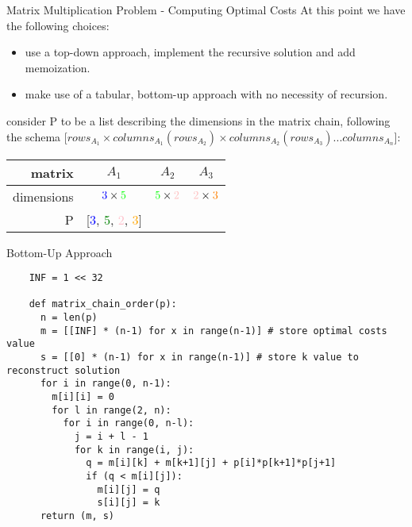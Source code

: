 \begin{frame}{Matrix Multiplication Problem - Computing Optimal Costs}
  At this point we have the following choices:
  \begin{itemize}
    \item use a top-down approach, implement the recursive solution and add memoization.
    \item make use of a tabular, bottom-up approach with no necessity of recursion.
  \end{itemize}
  \vspace{0.7em}
  consider P to be a list describing the dimensions in the matrix chain, following the schema
  [$rows_{A_{1}}  \times columns_{A_{1}}(rows_{A_{2}}) \times columns_{A_{2}} (rows_{A_{3}}) ... columns_{A_{n}}$]:
  \\
  \vspace{0.7em}
  \begin{tabular}{r|ccc}
    matrix & $A_1$ & $A_2$ & $A_3$ \\
    \hline 
    dimensions & $\textcolor{blue}{3} \times \textcolor{green}{5}$ & $\textcolor{green}{5} \times \textcolor{pink}{2}$ & $\textcolor{pink}{2} \times \textcolor{orange}{3}$ \\
    P & [\textcolor{blue}{3}, \textcolor{green}{5}, \textcolor{pink}{2}, \textcolor{orange}{3}]
  \end{tabular}

\end{frame}

\begin{frame}[fragile]{Bottom-Up Approach}
  
  \begin{lstlisting}
    INF = 1 << 32
    
    def matrix_chain_order(p):
      n = len(p)
      m = [[INF] * (n-1) for x in range(n-1)] # store optimal costs value 
      s = [[0] * (n-1) for x in range(n-1)] # store k value to reconstruct solution
      for i in range(0, n-1):
        m[i][i] = 0
        for l in range(2, n):
          for i in range(0, n-l):
            j = i + l - 1
            for k in range(i, j):
              q = m[i][k] + m[k+1][j] + p[i]*p[k+1]*p[j+1]
              if (q < m[i][j]):
                m[i][j] = q
                s[i][j] = k
      return (m, s)
  \end{lstlisting}
\end{frame}

